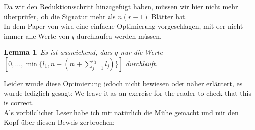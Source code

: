 \documentclass[a4paper,10pt,ngerman]{scrartcl}
\newtheorem{lemma}[satz]{Lemma}
\begin{document}
    Da wir den Reduktionsschritt hinzugefügt haben, müssen wir hier nicht mehr überprüfen, ob die Signatur mehr als $n (r - 1)$ Blätter hat. \\
    In dem Paper von \cite{golin_dynamic_1998} wird eine einfache Optimierung vorgeschlagen, mit der nicht immer alle Werte von $q$ durchlaufen werden müssen.
    \begin{lemma}
        \label{lem:reader_1}
        Es ist ausreichend, dass $q$ nur die Werte $[0, \dots, \min\{l_1, n - \left(m + \sum^{c_2}_{j=1} l_j\right)\}]$ durchläuft.
    \end{lemma}
    Leider wurde diese Optimierung jedoch nicht bewiesen oder näher erläutert, es wurde lediglich gesagt: \glqq We leave it as an exercise for the reader to check that this is correct.\grqq \\
    Als vorbildlicher Leser habe ich mir natürlich die Mühe gemacht und mir den Kopf über diesen Beweis zerbrochen:
\end{document}
